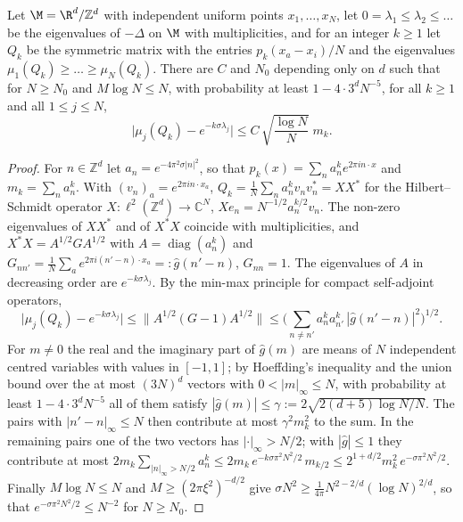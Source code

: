 \begin{lemma}\label{lem:kernelmatrix}
Let $\M=\R^d/\mathbb Z^d$ with independent uniform points $x_1,\dots,x_N$, let $0=\lambda_1\le\lambda_2\le\dots$ be the eigenvalues of $-\Delta$ on $\M$ with multiplicities, and for an integer $k\ge1$ let $Q_k$ be the symmetric matrix with the entries $p_k(x_a-x_i)/N$ and the eigenvalues $\mu_1(Q_k)\ge\dots\ge\mu_N(Q_k)$. There are $C$ and $N_0$ depending only on $d$ such that for $N\ge N_0$ and $M\log N\le N$, with probability at least $1-4\cdot3^dN^{-5}$, for all $k\ge1$ and all $1\le j\le N$,
\[
\big|\mu_j(Q_k)-e^{-k\sigma\lambda_j}\big|\le C\,\sqrt{\frac{\log N}{N}}\;m_k .
\]
\end{lemma}

\begin{proof}
For $n\in\mathbb Z^d$ let $a_n=e^{-4\pi^2\sigma|n|^2}$, so that $p_k(x)=\sum_na_n^ke^{2\pi in\cdot x}$ and $m_k=\sum_na_n^k$. With $(v_n)_a=e^{2\pi in\cdot x_a}$, $Q_k=\frac1N\sum_na_n^kv_nv_n^*=XX^*$ for the Hilbert--Schmidt operator $X\colon\ell^2(\mathbb Z^d)\to\mathbb C^N$, $Xe_n=N^{-1/2}a_n^{k/2}v_n$. The non-zero eigenvalues of $XX^*$ and of $X^*X$ coincide with multiplicities, and $X^*X=A^{1/2}GA^{1/2}$ with $A=\operatorname{diag}(a_n^k)$ and $G_{nn'}=\frac1N\sum_ae^{2\pi i(n'-n)\cdot x_a}=:\hat g(n'-n)$, $G_{nn}=1$. The eigenvalues of $A$ in decreasing order are $e^{-k\sigma\lambda_j}$. By the min-max principle for compact self-adjoint operators,
\[
\big|\mu_j(Q_k)-e^{-k\sigma\lambda_j}\big|\le\big\|A^{1/2}(G-1)A^{1/2}\big\|\le\Big(\sum_{n\ne n'}a_n^ka_{n'}^k\,|\hat g(n'-n)|^2\Big)^{1/2}.
\]
For $m\ne0$ the real and the imaginary part of $\hat g(m)$ are means of $N$ independent centred variables with values in $[-1,1]$; by Hoeffding's inequality and the union bound over the at most $(3N)^d$ vectors with $0<|m|_\infty\le N$, with probability at least $1-4\cdot3^dN^{-5}$ all of them satisfy $|\hat g(m)|\le\gamma:=2\sqrt{2(d+5)\log N/N}$. The pairs with $|n'-n|_\infty\le N$ then contribute at most $\gamma^2m_k^2$ to the sum. In the remaining pairs one of the two vectors has $|\cdot|_\infty>N/2$; with $|\hat g|\le1$ they contribute at most $2m_k\sum_{|n|_\infty>N/2}a_n^k\le2m_k\,e^{-k\sigma\pi^2N^2/2}\,m_{k/2}\le2^{1+d/2}m_k^2\,e^{-\sigma\pi^2N^2/2}$. Finally $M\log N\le N$ and $M\ge(2\pi\xi^2)^{-d/2}$ give $\sigma N^2\ge\frac1{4\pi}N^{2-2/d}(\log N)^{2/d}$, so that $e^{-\sigma\pi^2N^2/2}\le N^{-2}$ for $N\ge N_0$.
\end{proof}

